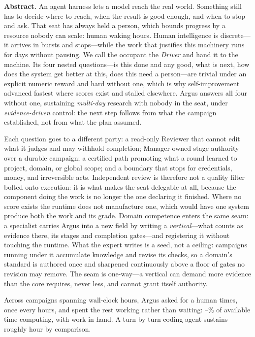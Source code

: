 \documentclass[10pt,letterpaper]{article}
\newcommand{\systemname}{Argus\xspace}
\begin{document}
\begin{abstractbox}
\small
\textbf{Abstract.}
An agent harness lets a model reach the real world. Something still has to decide
where to reach, when the result is good enough, and when to stop and ask. That seat
has always held a person, which bounds progress by a resource nobody can scale: human
waking hours. Human intelligence is discrete---it arrives in bursts and stops---while
the work that justifies this machinery runs for days without pausing. We call the occupant the \emph{Driver} and hand it to the machine. Its four
nested questions---is this done and any good, what is next, how does the system get
better at this, does this need a person---are trivial under an explicit numeric
reward and hard without one, which is why self-improvement advanced fastest where
scores exist and stalled elsewhere. \systemname{} answers all four without one, sustaining
\emph{multi-day} research with nobody in the seat, under \emph{evidence-driven}
control: the next step follows
from what the campaign established, not from what the plan assumed.

Each question goes to a different party: a read-only Reviewer that cannot edit what
it judges and may withhold completion; Manager-owned stage authority over a durable
campaign; a certified path promoting what a round learned to project, domain, or
global scope; and a boundary that stops for credentials, money, and irreversible acts. Independent review is therefore not a quality
filter bolted onto execution: it is what makes the seat delegable at all, because
the component doing the work is no longer the one declaring it finished. Where no score exists the runtime does not
manufacture one, which would have one system produce both the work and its grade.
Domain competence enters the same seam: a specialist carries \systemname{} into a new
field by writing a \emph{vertical}---what counts as evidence there, its stages and
completion gates---and registering it without touching the runtime. What the expert writes is a
seed, not a ceiling: campaigns running under it accumulate knowledge and revise its
checks, so a domain's standard is authored once and sharpened continuously above a
floor of gates no revision may remove. The seam is one-way---a vertical can demand
more evidence than the core requires, never less, and cannot grant itself
authority.

Across \DutyCampaigns{} campaigns spanning \DutyWallHours{} wall-clock hours,
\systemname{} asked for a human \DutyInterruptions{} times, once every
\DutyInterval{} hours, and spent the rest working rather than waiting:
\DutyCycleLow--\DutyCycleHigh\% of available time computing, with work in hand. A
turn-by-turn coding agent sustains roughly \CodexEndurance{} hour by comparison.


\end{abstractbox}
\end{document}
